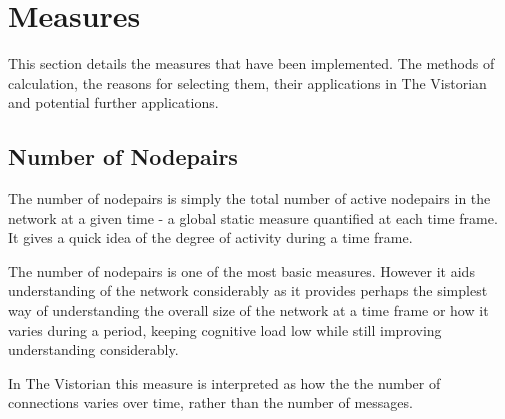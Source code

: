 
\chapter{Measures}

This section details the measures that have been implemented. The methods of calculation, the reasons for selecting them, their applications in The Vistorian and potential further applications. 

\section{Number of Nodepairs}
The number of nodepairs is simply the total number of active nodepairs in the network at a given time - a global static measure quantified at each time frame. It gives a quick idea of the degree of activity during a time frame.

The number of nodepairs is one of the most basic measures. However it aids understanding of the network considerably as it provides perhaps the simplest way of understanding the overall size of the network at a time frame or how it varies during a period, keeping cognitive load low while still improving understanding considerably.

In The Vistorian this measure is interpreted as how the the number of connections varies over time, rather than the number of messages.


